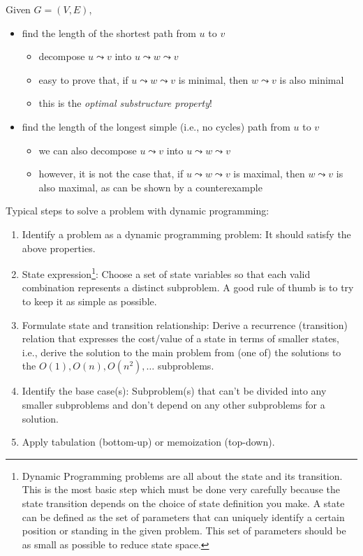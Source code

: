 \begin{example}\label{ex:unweighted_shortest_longest_path}
Given $G=(V,E)$,
\begin{itemize}
  \item find the length of the shortest path from $u$ to $v$
    \begin{itemize}
    \item decompose $u\leadsto v$ into $u\leadsto w\leadsto v$
    \item easy to prove that, if $u\leadsto w\leadsto v$ is minimal, then $w\leadsto v$ is also minimal
    \item this is the \emph{optimal substructure property}!
    \end{itemize}
  \item find the length of the longest simple (i.e., no cycles) path from $u$ to $v$
    \begin{itemize}
    \item we can also decompose $u\leadsto v$ into $u\leadsto w\leadsto v$
    \item however, it is not the case that, if $u\leadsto w\leadsto v$ is maximal, then $w\leadsto v$ is also maximal, as can be shown by a counterexample \qedhere
    \end{itemize}
  \end{itemize}
\end{example}

Typical steps to solve a problem with dynamic programming:
\begin{enumerate}
  \item Identify a problem as a dynamic programming problem: It should satisfy the above properties.
  \item State expression\footnote{Dynamic Programming problems are all about the state and its transition. This is the most basic step which must be done very carefully because the state transition depends on the choice of state definition you make.
        A state can be defined as the set of parameters that can uniquely identify a certain position or standing in the given problem. This set of parameters should be as small as possible to reduce state space.}: Choose a set of state variables so that each valid combination represents a distinct subproblem. A good rule of thumb is to try to keep it as simple as possible.
  \item Formulate state and transition relationship: Derive a recurrence (transition) relation that expresses the cost/value of a state in terms of smaller states, i.e., derive the solution to the main problem from (one of) the solutions to the $O(1), O(n), O(n^2), \ldots$ subproblems.
  \item Identify the base case(s): Subproblem(s) that can't be divided into any smaller subproblems and don't depend on any other subproblems for a solution.
  \item Apply tabulation (bottom-up) or memoization (top-down).
\end{enumerate}

